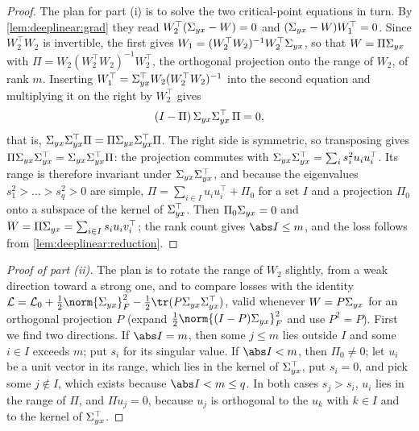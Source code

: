 \begin{refsection}
\begin{proof}
The plan for part (i) is to solve the two critical-point equations in turn. By \cref{lem:deeplinear:grad} they read $W_2^\top(\Sigma_{yx}-W)=0$ and $(\Sigma_{yx}-W)W_1^\top=0$. Since $W_2^\top W_2$ is invertible, the first gives $W_1=(W_2^\top W_2)^{-1}W_2^\top\Sigma_{yx}$, so that $W=\Pi\Sigma_{yx}$ with $\Pi=W_2(W_2^\top W_2)^{-1}W_2^\top$, the orthogonal projection onto the range of $W_2$, of rank $m$. Inserting $W_1^\top=\Sigma_{yx}^\top W_2(W_2^\top W_2)^{-1}$ into the second equation and multiplying it on the right by $W_2^\top$ gives
\[
  (I-\Pi)\,\Sigma_{yx}\Sigma_{yx}^\top\,\Pi=0 ,
\]
that is, $\Sigma_{yx}\Sigma_{yx}^\top\Pi=\Pi\Sigma_{yx}\Sigma_{yx}^\top\Pi$. The right side is symmetric, so transposing gives $\Pi\Sigma_{yx}\Sigma_{yx}^\top=\Sigma_{yx}\Sigma_{yx}^\top\Pi$: the projection commutes with $\Sigma_{yx}\Sigma_{yx}^\top=\sum_is_i^2u_iu_i^\top$. Its range is therefore invariant under $\Sigma_{yx}\Sigma_{yx}^\top$, and because the eigenvalues $s_1^2>\dots>s_q^2>0$ are simple, $\Pi=\sum_{i\in I}u_iu_i^\top+\Pi_0$ for a set $I$ and a projection $\Pi_0$ onto a subspace of the kernel of $\Sigma_{yx}^\top$. Then $\Pi_0\Sigma_{yx}=0$ and $W=\Pi\Sigma_{yx}=\sum_{i\in I}s_iu_iv_i^\top$; the rank count gives $\abs I\le m$, and the loss follows from \cref{lem:deeplinear:reduction}.
\end{proof}

\begin{proof}[Proof of part (ii)]
The plan is to rotate the range of $W_2$ slightly, from a weak direction toward a strong one, and to compare losses with the identity $\Loss=\dlLzero+\frac12\norm{\dlS}_F^2-\frac12\tr(P\dlS\dlS^\top)$, valid whenever $W=P\Sigma_{yx}$ for an orthogonal projection $P$ (expand $\frac12\norm{(I-P)\dlS}_F^2$ and use $P^2=P$). First we find two directions. If $\abs I=m$, then some $j\le m$ lies outside $I$ and some $i\in I$ exceeds $m$; put $s_i$ for its singular value. If $\abs I<m$, then $\Pi_0\ne0$; let $u_i$ be a unit vector in its range, which lies in the kernel of $\Sigma_{yx}^\top$, put $s_i=0$, and pick some $j\notin I$, which exists because $\abs I<m\le q$. In both cases $s_j>s_i$, $u_i$ lies in the range of $\Pi$, and $\Pi u_j=0$, because $u_j$ is orthogonal to the $u_k$ with $k\in I$ and to the kernel of $\Sigma_{yx}^\top$.


\end{proof}
\end{refsection}

